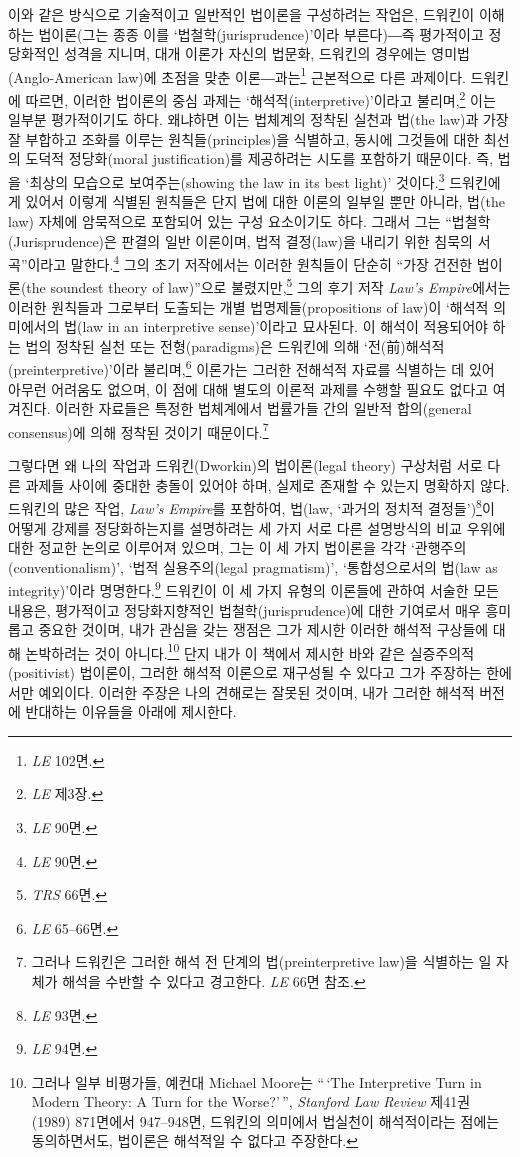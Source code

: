이와 같은 방식으로 기술적이고 일반적인 법이론을 구성하려는 작업은,
드워킨이 이해하는 법이론(그는 종종 이를 `법철학(jurisprudence)'이라
부른다)―즉 평가적이고 정당화적인 성격을 지니며, 대개 이론가 자신의
법문화, 드워킨의 경우에는 영미법(Anglo-American law)에 초점을 맞춘
이론―과는\footnote{\emph{LE} 102면.} 근본적으로 다른 과제이다. 드워킨에
따르면, 이러한 법이론의 중심 과제는 `해석적(interpretive)'이라고
불리며,\footnote{\emph{LE} 제3장.} 이는 일부분 평가적이기도 하다.
왜냐하면 이는 법체계의 정착된 실천과 법(the law)과 가장 잘 부합하고
조화를 이루는 원칙들(principles)을 식별하고, 동시에 그것들에 대한 최선의
도덕적 정당화(moral justification)를 제공하려는 시도를 포함하기
때문이다. 즉, 법을 `최상의 모습으로 보여주는(showing the law in its best
light)' 것이다.\footnote{\emph{LE} 90면.} 드워킨에게 있어서 이렇게
식별된 원칙들은 단지 법에 대한 이론의 일부일 뿐만 아니라, 법(the law)
자체에 암묵적으로 포함되어 있는 구성 요소이기도 하다. 그래서 그는
``법철학(Jurisprudence)은 판결의 일반 이론이며, 법적 결정(law)을 내리기
위한 침묵의 서곡''이라고 말한다.\footnote{\emph{LE} 90면.} 그의 초기
저작에서는 이러한 원칙들이 단순히 ``가장 건전한 법이론(the soundest
theory of law)''으로 불렸지만,\footnote{\emph{TRS} 66면.} 그의 후기 저작
\emph{Law's Empire}에서는 이러한 원칙들과 그로부터 도출되는 개별
법명제들(propositions of law)이 `해석적 의미에서의 법(law in an
interpretive sense)'이라고 묘사된다. 이 해석이 적용되어야 하는 법의
정착된 실천 또는 전형(paradigms)은 드워킨에 의해
`전(前)해석적(preinterpretive)'이라 불리며,\footnote{\emph{LE} 65--66면.}
이론가는 그러한 전해석적 자료를 식별하는 데 있어 아무런 어려움도 없으며,
이 점에 대해 별도의 이론적 과제를 수행할 필요도 없다고 여겨진다. 이러한
자료들은 특정한 법체계에서 법률가들 간의 일반적 합의(general
consensus)에 의해 정착된 것이기 때문이다.\footnote{그러나 드워킨은
  그러한 해석 전 단계의 법(preinterpretive law)을 식별하는 일 자체가
  해석을 수반할 수 있다고 경고한다. \emph{LE} 66면 참조.}

그렇다면 왜 나의 작업과 드워킨(Dworkin)의 법이론(legal theory) 구상처럼
서로 다른 과제들 사이에 중대한 충돌이 있어야 하며, 실제로 존재할 수
있는지 명확하지 않다. 드워킨의 많은 작업, \emph{Law's Empire}를
포함하여, 법(law, `과거의 정치적 결정들')\footnote{\emph{LE} 93면.}이
어떻게 강제를 정당화하는지를 설명하려는 세 가지 서로 다른 설명방식의
비교 우위에 대한 정교한 논의로 이루어져 있으며, 그는 이 세 가지 법이론을
각각 `관행주의(conventionalism)', `법적 실용주의(legal pragmatism)',
`통합성으로서의 법(law as integrity)'이라 명명한다.\footnote{\emph{LE}
  94면.} 드워킨이 이 세 가지 유형의 이론들에 관하여 서술한 모든 내용은,
평가적이고 정당화지향적인 법철학(jurisprudence)에 대한 기여로서 매우
흥미롭고 중요한 것이며, 내가 관심을 갖는 쟁점은 그가 제시한 이러한
해석적 구상들에 대해 논박하려는 것이 아니다.\footnote{그러나 일부
  비평가들, 예컨대 Michael Moore는 ``\,`The Interpretive Turn in Modern
  Theory: A Turn for the Worse?'\,'', \emph{Stanford Law Review} 제41권
  (1989) 871면에서 947--948면, 드워킨의 의미에서 법실천이 해석적이라는
  점에는 동의하면서도, 법이론은 해석적일 수 없다고 주장한다.} 단지 내가
이 책에서 제시한 바와 같은 실증주의적(positivist) 법이론이, 그러한
해석적 이론으로 재구성될 수 있다고 그가 주장하는 한에서만 예외이다.
이러한 주장은 나의 견해로는 잘못된 것이며, 내가 그러한 해석적 버전에
반대하는 이유들을 아래에 제시한다.

